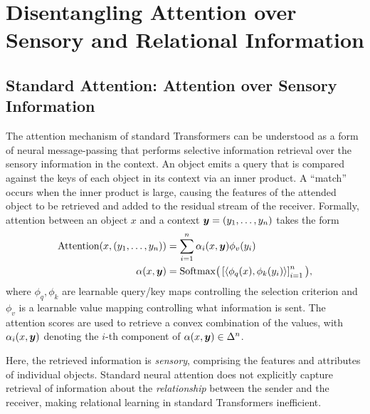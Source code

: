 \section{Disentangling Attention over Sensory and Relational Information}

\subsection{Standard Attention: Attention over Sensory Information}

The attention mechanism of standard Transformers can be understood as a form of neural message-passing that performs selective information retrieval over the sensory information in the context. An object emits a query that is compared against the keys of each object in its context via an inner product. A ``match'' occurs when the inner product is large, causing the features of the attended object to be retrieved and added to the residual stream of the receiver. Formally, attention between an object $x$ and a context $\bm{y} = (y_1, \ldots, y_n)$ takes the form%
\begin{equation}\label{eq:self_attn}
  \begin{split}
    \mathrm{Attention}(x, (y_1, \ldots, y_n)) &= \sum_{i=1}^{n} \alpha_i(x, \bm{y}) \phi_v(y_i) \\
    \alpha(x, \bm{y}) &= \mathrm{Softmax}\big(\left[\left \langle \phi_q(x), \phi_k(y_i) \right\rangle\right]_{i=1}^{n}\big),
  \end{split}
\end{equation}
where $\phi_q,\phi_k$ are learnable query/key maps controlling the selection criterion and $\phi_v$ is a learnable value mapping controlling what information is sent. The attention scores are used to retrieve a convex combination of the values, with $\alpha_i(x, \bm{y})$ denoting the $i$-th component of $\alpha(x, \bm{y}) \in \Delta^n$.

Here, the retrieved information is \textit{sensory}, comprising the features and attributes of individual objects. Standard neural attention does not explicitly capture retrieval of information about the \textit{relationship} between the sender and the receiver, making relational learning in standard Transformers inefficient.


